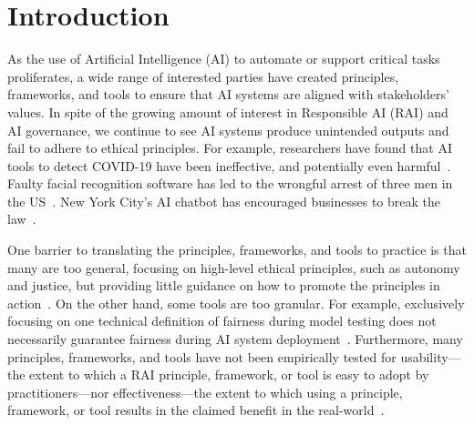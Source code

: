 \section{Introduction}
As the use of Artificial Intelligence (AI) to automate or support critical tasks proliferates, a wide range of interested parties have created principles, frameworks, and tools to ensure that AI systems are aligned with stakeholders' values.
In spite of the growing amount of interest in Responsible AI (RAI) and AI governance, we continue to see AI systems produce unintended outputs and fail to adhere to ethical principles.
For example, researchers have found that AI tools to detect COVID-19 have been ineffective, and potentially even harmful~\cite{heaven2021hundreds}.
Faulty facial recognition software has led to the wrongful arrest of three men in the US~\cite{johnson2022how}.
New York City's AI chatbot has encouraged businesses to break the law~\cite{lecher2024nyc}.

One barrier to translating the principles, frameworks, and tools to practice is that many are too general, focusing on high-level ethical principles, such as autonomy and justice, but providing little guidance on how to promote the principles in action~\cite{Morley2019, schiff2020principles}.
On the other hand, some tools are too granular. For example, exclusively focusing on one technical definition of fairness during model testing does not necessarily guarantee fairness during AI system deployment~\cite{Kaye2023}.
Furthermore, many principles, frameworks, and tools have not been empirically tested for usability---the extent to which a RAI principle, framework, or tool is easy to adopt by practitioners---nor effectiveness---the extent to which using a principle, framework, or tool results in the claimed benefit in the real-world~\cite{mittelstadt2019ai, Kaye2023, berman2024scoping, cartwright2009thing}. 

